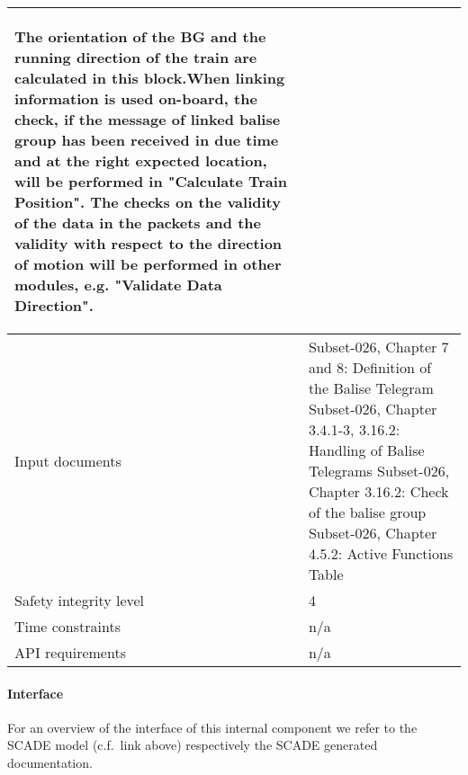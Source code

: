 \begin{longtable}{p{}p{}}
\begin{itemize}
\end{itemize}
The orientation of the BG and the running direction of the train are
calculated in this block.When linking information is used on-board,
the check, if the message of linked balise group has been received
in due time and at the right expected location, will be performed in
"Calculate Train Position". The checks on the validity of the data in
the packets and the validity with respect to the direction of motion
will be performed in other modules, e.g. "Validate Data Direction".\\
\midrule
Input documents	& 
Subset-026, Chapter 7 and 8: Definition of the Balise Telegram\newline
Subset-026, Chapter 3.4.1-3, 3.16.2: Handling of Balise Telegrams\newline
Subset-026, Chapter 3.16.2: Check of the balise group\newline
Subset-026, Chapter 4.5.2: Active Functions Table\\
\midrule
Safety integrity level		& 4 \\
\midrule
Time constraints		& n/a \\
\midrule
API requirements 		& n/a \\
\bottomrule
\end{longtable}


\paragraph{Interface}

For an overview of the interface of this internal component we refer to the SCADE model (c.f.~link above) respectively the SCADE generated documentation.